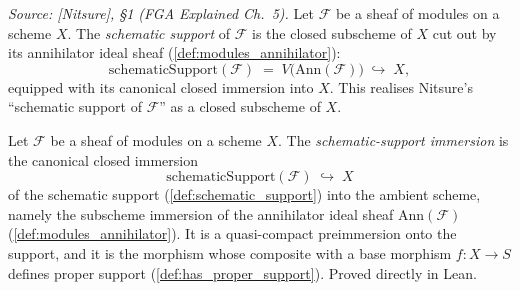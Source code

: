 \begin{definition}

  \label{def:schematic_support}
  \textit{Source: [Nitsure], \S 1 (FGA Explained Ch.~5).}
  Let \(\mathcal{F}\) be a sheaf of modules on a scheme \(X\). The
  \emph{schematic support} of \(\mathcal{F}\) is the closed subscheme of \(X\)
  cut out by its annihilator ideal sheaf (\cref{def:modules_annihilator}):
  \[
    \mathrm{schematicSupport}(\mathcal{F})
    \;=\; V\bigl(\mathrm{Ann}(\mathcal{F})\bigr) \;\hookrightarrow\; X,
  \]
  equipped with its canonical closed immersion into \(X\). This realises
  Nitsure's ``schematic support of \(\mathcal{F}\)'' as a closed subscheme of
  \(X\).
\end{definition}

\begin{definition}
  \label{def:schematic_support_immersion}
  Let \(\mathcal{F}\) be a sheaf of modules on a scheme \(X\). The
  \emph{schematic-support immersion} is the canonical closed immersion
  \[
    \mathrm{schematicSupport}(\mathcal{F}) \;\hookrightarrow\; X
  \]
  of the schematic support (\cref{def:schematic_support}) into the ambient
  scheme, namely the subscheme immersion of the annihilator ideal sheaf
  \(\mathrm{Ann}(\mathcal{F})\) (\cref{def:modules_annihilator}). It is a
  quasi-compact preimmersion onto the support, and it is the morphism whose
  composite with a base morphism \(f : X \to S\) defines proper support
  (\cref{def:has_proper_support}). Proved directly in Lean.
\end{definition}

